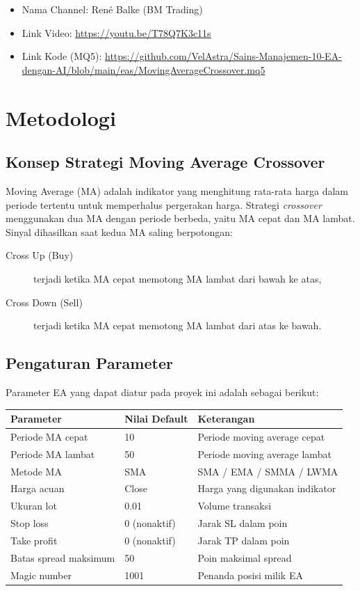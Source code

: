 \documentclass[12pt,a4paper]{article}
\begin{document}
\begin{itemize}
\item Nama Channel: Ren\'e Balke (BM Trading)
\item Link Video: \url{https://youtu.be/T78Q7K3c11s}
\item Link Kode (MQ5): \url{https://github.com/VelAstra/Sains-Manajemen-10-EA-dengan-AI/blob/main/eas/MovingAverageCrossover.mq5}
\end{itemize}

\section{Metodologi}

\subsection{Konsep Strategi Moving Average Crossover}
Moving Average (MA) adalah indikator yang menghitung rata-rata harga dalam periode tertentu
untuk memperhalus pergerakan harga. Strategi \textit{crossover} menggunakan dua MA dengan
periode berbeda, yaitu MA cepat dan MA lambat. Sinyal dihasilkan saat kedua MA saling
berpotongan:

\begin{description}
\item[Cross Up (Buy)] terjadi ketika MA cepat memotong MA lambat dari bawah ke atas,
\item[Cross Down (Sell)] terjadi ketika MA cepat memotong MA lambat dari atas ke bawah.
\end{description}

\subsection{Pengaturan Parameter}
Parameter EA yang dapat diatur pada proyek ini adalah sebagai berikut:

\begin{longtable}{@{}p{}p{}p{}@{}}
\toprule
\textbf{Parameter} & \textbf{Nilai Default} & \textbf{Keterangan} \\
\midrule
Periode MA cepat & 10 & Periode moving average cepat \\
Periode MA lambat & 50 & Periode moving average lambat \\
Metode MA & SMA & SMA / EMA / SMMA / LWMA \\
Harga acuan & Close & Harga yang digunakan indikator \\
Ukuran lot & 0.01 & Volume transaksi \\
Stop loss & 0 (nonaktif) & Jarak SL dalam poin \\
Take profit & 0 (nonaktif) & Jarak TP dalam poin \\
Batas spread maksimum & 50 & Poin maksimal spread \\
Magic number & 1001 & Penanda posisi milik EA \\
\bottomrule
\end{longtable}
\end{document}
